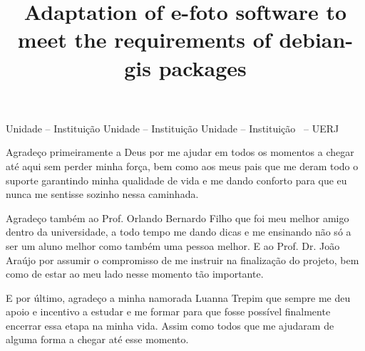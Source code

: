 \documentclass[a4paper,12pt,oneside,onecolumn,final,fleqn]{repUERJ}
\title{Adaptation of e-foto software to meet the requirements of debian-gis packages}
\begin{document}
	
	\frontmatter %
	
	\capa
	\folhaderosto
	\fichacatalografica{}
	\begin{folhadeaprovacao}
		{Unidade -- Instituição}
		{Unidade -- Instituição}
		{Unidade -- Instituição}
		{\UERJunidade \UERJunidadenome\ -- UERJ}
	\end{folhadeaprovacao}
	
	Agradeço primeiramente a Deus por me ajudar em todos os momentos a chegar até aqui sem perder minha força, bem como aos meus pais que me deram todo o suporte garantindo minha qualidade de vida e me dando conforto para que eu nunca me sentisse sozinho nessa caminhada.
	
	Agradeço também ao Prof. Orlando Bernardo Filho que foi meu melhor amigo dentro da universidade, a todo tempo me dando dicas e me ensinando não só a ser um aluno melhor como também uma pessoa melhor. E ao Prof. Dr. João Araújo por assumir o compromisso de me instruir na finalização do projeto, bem como de estar ao meu lado nesse momento tão importante.
	
	E por último, agradeço a minha namorada Luanna Trepim que sempre me deu apoio e incentivo a estudar e me formar para que fosse possível finalmente encerrar essa etapa na minha vida. Assim como todos que me ajudaram de alguma forma a chegar até esse momento.
	
\end{document}

